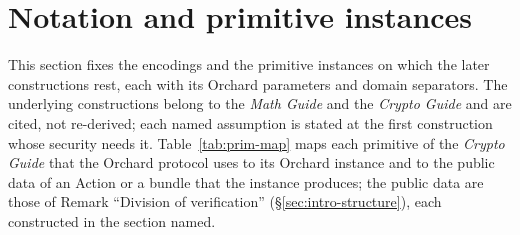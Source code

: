 \documentclass[11pt,a4paper]{article}
\theoremstyle{definition}
\begin{document}
\section{Notation and primitive instances}\label{sec:prim}

This section fixes the encodings and the primitive instances on which the
later constructions rest, each with its Orchard parameters and domain
separators. The underlying constructions belong to the \emph{Math Guide} and
the \emph{Crypto Guide} and are cited, not re-derived; each named assumption
is stated at the first construction whose security needs it.
Table~\ref{tab:prim-map} maps each primitive of the \emph{Crypto Guide} that
the Orchard protocol uses to its Orchard instance and to the public data of
an Action or a bundle that the instance produces; the public data are those
of Remark ``Division of verification'' (\S\ref{sec:intro-structure}), each
constructed in the section named.
\end{document}
